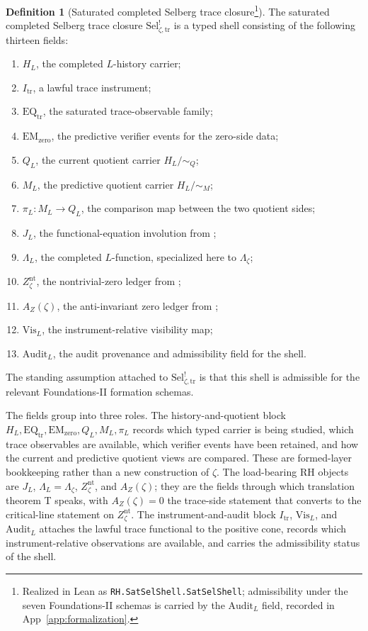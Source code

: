 \documentclass[11pt]{article}
\newcommand{\JL}{J_{L}}
\newcommand{\Lzeta}{\Lambda_{\zeta}}
\newcommand{\Znt}{Z_{\zeta}^{\mathrm{nt}}}
\newcommand{\AZ}{A_{Z}(\zeta)}
\newcommand{\Sel}{\mathrm{Sel}^{!}_{\zeta,\mathrm{tr}}}
\newcommand{\Itr}{I_{\mathrm{tr}}}
\theoremstyle{definition}
\newtheorem{definition}[theorem]{Definition}
\begin{document}
\begin{definition}[Saturated completed Selberg trace closure\footnote{Realized in Lean as \nolinkurl{RH.SatSelShell.SatSelShell}; admissibility under the seven Foundations-II schemas is carried by the \(\mathrm{Audit}_L\) field, recorded in App~\ref{app:formalization}.}]
\label{def:rh:sat-sel-shell}
The saturated completed Selberg trace closure \(\Sel\) is a typed
shell consisting of the following thirteen fields:
\begin{enumerate}[label=\textup{(\arabic*)}]
  \item \(H_L\), the completed \(L\)-history carrier;
  \item \(\Itr\), a lawful trace instrument;
  \item \(\mathrm{EQ}_{\mathrm{tr}}\), the saturated trace-observable
        family;
  \item \(\mathrm{EM}_{\mathrm{zero}}\), the predictive verifier
        events for the zero-side data;
  \item \(Q_L\), the current quotient carrier \(H_L/{\sim_Q}\);
  \item \(M_L\), the predictive quotient carrier \(H_L/{\sim_M}\);
  \item \(\pi_L : M_L\to Q_L\), the comparison map between the two
        quotient sides;
  \item \(\JL\), the functional-equation involution from
        ;
  \item \(\Lambda_L\), the completed \(L\)-function, specialized here
        to \(\Lzeta\);
  \item \(\Znt\), the nontrivial-zero ledger from
        ;
  \item \(\AZ\), the anti-invariant zero ledger from
        ;
  \item \(\mathrm{Vis}_{L}\), the instrument-relative visibility map;
  \item \(\mathrm{Audit}_{L}\), the audit provenance and admissibility
        field for the shell.
\end{enumerate}
The standing assumption attached to \(\Sel\) is that this shell is
admissible for the relevant Foundations-II formation schemas.
\end{definition}

The fields group into three roles.  The history-and-quotient block
\(H_L,\mathrm{EQ}_{\mathrm{tr}},\mathrm{EM}_{\mathrm{zero}},Q_L,M_L,\pi_L\)
records which typed carrier is being studied, which trace
observables are available, which verifier events have been retained,
and how the current and predictive quotient views are compared.
These are formed-layer bookkeeping rather than a new construction of
\(\zeta\).  The load-bearing RH objects are \(\JL\),
\(\Lambda_L=\Lzeta\), \(\Znt\), and \(\AZ\); they are the fields
through which translation theorem T speaks, with \(\AZ=0\) the
trace-side statement that converts to the critical-line statement on
\(\Znt\).  The instrument-and-audit block \(\Itr\),
\(\mathrm{Vis}_{L}\), and \(\mathrm{Audit}_{L}\) attaches the lawful
trace functional to the positive cone, records which
instrument-relative observations are available, and carries the
admissibility status of the shell.
\end{document}
